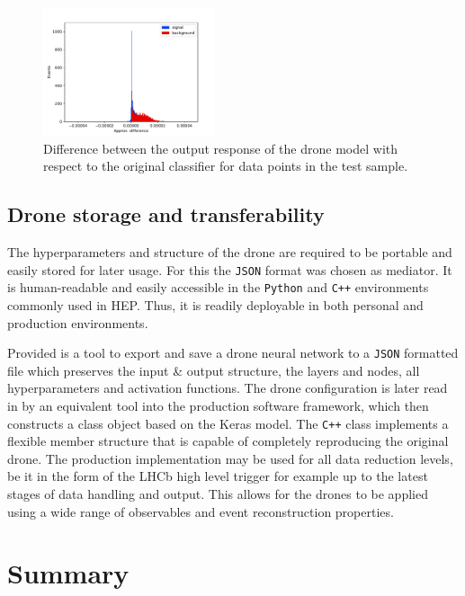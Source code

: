 \documentclass[final,5p,times,twocolumn]{elsarticle}
\def\lhcb {\mbox{LHCb}\xspace}
\begin{document}
\begin{figure}[t]
\centering
\includegraphics[width=0.45\textwidth]{approx_vs_truth_diff.pdf}
\caption{\small 
Difference between the output response of the drone model with respect to
the original classifier for data points in the test sample.
}
\label{fig:diff}
\end{figure}

\subsection{Drone storage and transferability}
\label{sec:storage}

The hyperparameters and structure of the drone are required to be 
portable and easily stored for later usage. For this the {\tt JSON} format was chosen as 
mediator. It is human-readable and easily accessible in the {\tt Python} and {\tt C++}
environments commonly used in HEP. Thus, it is readily deployable in both personal and production environments.

Provided is a tool to export and save a drone neural network to a {\tt JSON} 
formatted file which preserves the input \& output structure, 
the layers and nodes, all hyperparameters and activation functions. 
The drone configuration is later read in by an equivalent tool into the production software framework,
which then constructs a class object based on the Keras model. The {\tt C++} class implements 
a flexible member structure that is capable of completely reproducing the original drone. The production
implementation may be used for all data reduction levels, be it in the form of the \lhcb high level trigger
for example up to the latest stages of data handling and output. 
This allows for the drones to be applied using a wide range of observables and event reconstruction properties. 


\section{Summary}
\label{sec:summary}
\end{document}
